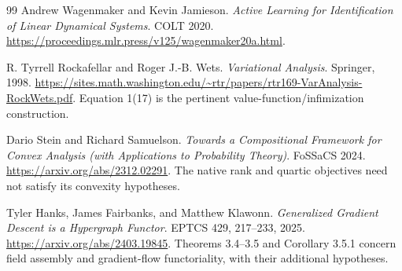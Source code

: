 \documentclass[11pt]{article}
\theoremstyle{remark}
\begin{document}
\begin{thebibliography}{99}
Andrew Wagenmaker and Kevin Jamieson.
\emph{Active Learning for Identification of Linear Dynamical Systems}.
COLT 2020.
\url{https://proceedings.mlr.press/v125/wagenmaker20a.html}.

R. Tyrrell Rockafellar and Roger J.-B. Wets.
\emph{Variational Analysis}. Springer, 1998.
\url{https://sites.math.washington.edu/~rtr/papers/rtr169-VarAnalysis-RockWets.pdf}.
Equation 1(17) is the pertinent value-function/infimization construction.

Dario Stein and Richard Samuelson.
\emph{Towards a Compositional Framework for Convex Analysis (with Applications to Probability Theory)}.
FoSSaCS 2024.
\url{https://arxiv.org/abs/2312.02291}.
The native rank and quartic objectives need not satisfy its convexity hypotheses.

Tyler Hanks, James Fairbanks, and Matthew Klawonn.
\emph{Generalized Gradient Descent is a Hypergraph Functor}.
EPTCS 429, 217--233, 2025.
\url{https://arxiv.org/abs/2403.19845}.
Theorems 3.4--3.5 and Corollary 3.5.1 concern field assembly and gradient-flow functoriality, with their additional hypotheses.
\end{thebibliography}
\end{document}
